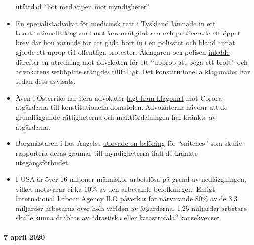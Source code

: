\begin{itemize}
  \href{https://www.srf.ch/news/regional/aargau-solothurn/festnahme-von-corona-kritiker-verschwoerung-oder-normale-intervention-der-aargauer-behoerden}{utfärdad}
  ``hot med vapen mot myndigheter''.
\item
  En specialistadvokat för medicinsk rätt i Tyskland lämnade in ett
  konstitutionellt klagomål mot koronaåtgärderna och publicerade ett
  öppet brev där hon varnade för att glida bort in i en polisstat och
  bland annat gjorde ett uprop till offentliga protester. Åklagaren och
  polisen
  \href{https://www.morgenweb.de/mannheimer-morgen_artikel,-coronavirus-aufruf-zu-straftaten-ermittlungen-gegen-heidelberger-rechtsanwaeltin-_arid,1627078.html}{inledde}
  därefter en utredning mot advokaten för ett ``upprop att begå ett
  brott'' och advokatens webbplats stängdes tillfälligt. Det
  konstitutionella klagomålet har sedan dess avvisats.
\item
  Även i Österrike har flera advokater
  \href{https://wien.orf.at/stories/3043172/}{lagt fram klagomål} mot
  Corona-åtgärderna till konstitutionella domstolen. Advokaterna hävdar
  att de grundläggande rättigheterna och maktfördelningen har kränkts av
  åtgärderna.
\item
  Borgmästaren i Los Angeles
  \href{https://townhall.com/tipsheet/bethbaumann/2020/04/04/la-mayor-garcetti-says-snitches-get-rewards-for-ratting-out-their-neighbors-n2566348}{ut}\href{https://townhall.com/tipsheet/bethbaumann/2020/04/04/la-mayor-garcetti-says-snitches-get-rewards-for-ratting-out-their-neighbors-n2566348}{lovade
  en belöning} för ``snitches'' som skulle rapportera deras grannar till
  myndigheterna ifall de kränkte utegångsförbudet.
\item
  I USA är över 16 miljoner människor arbetslösa på grund av
  nedläggningen, vilket motsvarar cirka 10\% av den arbetande
  befolkningen. Enligt International Labour Agency ILO
  \href{https://www.ilo.org/global/about-the-ilo/newsroom/news/WCMS_740893/lang--en/index.htm}{påverkas}
  för närvarande 80\% av de 3,3 miljarder arbetarna över hela världen av
  åtgärderna. 1,25 miljarder arbetare skulle kunna drabbas av
  ``drastiska eller katastrofala'' konsekvenser.
\end{itemize}

\hypertarget{7-april-2020}{%
\paragraph{7 april 2020}\label{7-april-2020}}

